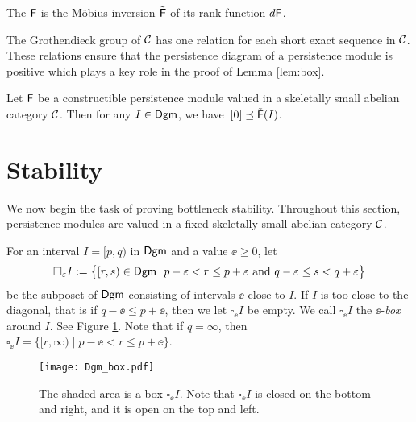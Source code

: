 \documentclass[12pt]{article}
\begin{document}
\begin{defn}
\label{defn:diagram}
The  ${\mathsf{F}}$
is the M\"obius inversion $\tilde {{\mathsf{F}}}$ of its rank function $d {\mathsf{F}}$.
\end{defn}

The Grothendieck group of ${\mathcal{C}}$ has one relation for each short exact sequence in ${\mathcal{C}}$.
These relations ensure that the persistence diagram of a persistence module is positive which
plays a key role in the proof of Lemma \ref{lem:box}.

\begin{prop}
\label{prop:positivity} 
Let ${\mathsf{F}}$ be a constructible persistence module 
valued in a skeletally small abelian category ${\mathcal{C}}$.
Then for any $I\in {\mathsf{Dgm}}$, we have~$[0] \preceq \tilde {{\mathsf{F}}}(I)$.
\end{prop}


\section{Stability}
We now begin the task of proving bottleneck stability.
Throughout this section, persistence modules are valued in a fixed skeletally small abelian
category ${\mathcal{C}}$.

\begin{defn}
For an interval $I = [p,q)$ in ${\mathsf{Dgm}}$ and a value $\ee \geq 0$, let
$$ \square_{\varepsilon} I :=  \big\{ [r,s) \in {\mathsf{Dgm}} \, \big |\, p-\varepsilon < r \leq p+\varepsilon \text{ and } q-\varepsilon \leq s < q+ \varepsilon \big \} $$ 
be the subposet of ${\mathsf{Dgm}}$ consisting of intervals $\ee$-close to $I$.
If $I$ is too close to the diagonal, that is if $q - \ee \leq p+\ee$, then we let
$\square_\ee I$ be empty.
We call $\square_\ee I$ the $\ee$-\emph{box} around $I$.
See Figure \ref{fig:integration}.
Note that if $q = \infty$, then $\square_\ee I = \big \{ [r, \infty) \; \big | \;  p-\ee < r \leq p+ \ee \big \}$.
\end{defn}

	\begin{figure}
	\begin{center}
	\texttt{[image: Dgm\_box.pdf]}
	\end{center}
	\caption{The shaded area is a box $\square_\ee I$.
	Note that $\square_\ee I$ is closed on the bottom and right, and it is open on the top and left.
	}
	\label{fig:integration}
	\end{figure}
\end{document}

